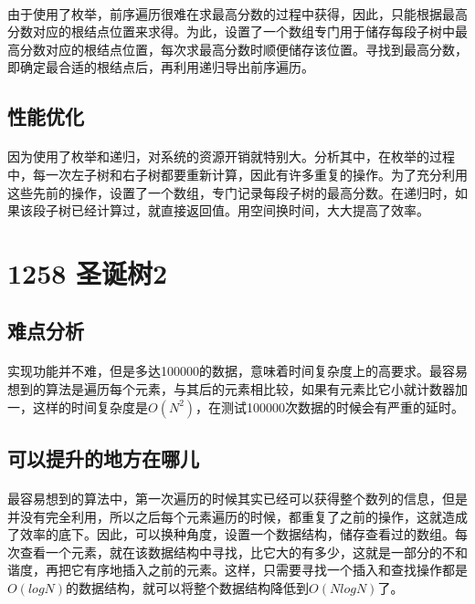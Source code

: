 \documentclass[UTF-8, 12pt]{ctexart}
\begin{document}
    \paragraph{}
    由于使用了枚举，前序遍历很难在求最高分数的过程中获得，因此，只能根据最高分数对应的根结点位置来求得。为此，设置了一个数组专门用于储存每段子树中最高分数对应的根结点位置，每次求最高分数时顺便储存该位置。寻找到最高分数，即确定最合适的根结点后，再利用递归导出前序遍历。
    
    \subsection{性能优化}
    \paragraph{}
    因为使用了枚举和递归，对系统的资源开销就特别大。分析其中，在枚举的过程中，每一次左子树和右子树都要重新计算，因此有许多重复的操作。为了充分利用这些先前的操作，设置了一个数组，专门记录每段子树的最高分数。在递归时，如果该段子树已经计算过，就直接返回值。用空间换时间，大大提高了效率。
    
\section{1258 圣诞树2}
    \subsection{难点分析}
    \paragraph{}
    实现功能并不难，但是多达100000的数据，意味着时间复杂度上的高要求。最容易想到的算法是遍历每个元素，与其后的元素相比较，如果有元素比它小就计数器加一，这样的时间复杂度是$O(N^2)$，在测试100000次数据的时候会有严重的延时。
    \subsection{可以提升的地方在哪儿}
    \paragraph{}
    最容易想到的算法中，第一次遍历的时候其实已经可以获得整个数列的信息，但是并没有完全利用，所以之后每个元素遍历的时候，都重复了之前的操作，这就造成了效率的底下。因此，可以换种角度，设置一个数据结构，储存查看过的数组。每次查看一个元素，就在该数据结构中寻找，比它大的有多少，这就是一部分的不和谐度，再把它有序地插入之前的元素。这样，只需要寻找一个插入和查找操作都是$O(logN)$的数据结构，就可以将整个数据结构降低到$O(NlogN)$了。
\end{document}
